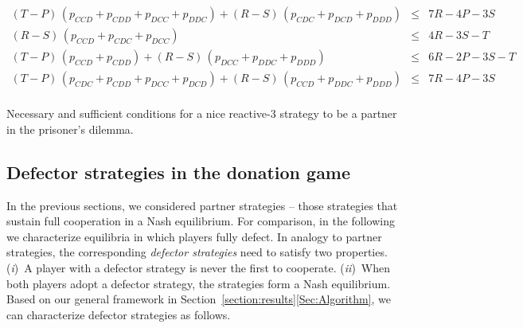 \documentclass[9pt,twoside,lineno]{pnas-new}
\theoremstyle{plainCl1}
\theoremstyle{plainCl2}
\begin{document}
\begin{table}[t!]
{{\begin{equation*}
\begin{array}{rcl}
    (T - P)\,(p_{CCD} + p_{CDD} + p_{DCC} + p_{DDC}) + (R - S)\,(p_{CDC} + p_{DCD} + p_{DDD}) & \le & 7 R \!-\! 4 P \!-\! 3 S \\ [0.2cm]
    (R - S)\,(p_{CCD} + p_{CDC} + p_{DCC}) & \le & 4 R \!-\! 3 S \!-\! T \\ [0.2cm]
    (T - P)\,(p_{CCD} + p_{CDD}) + (R - S)\,(p_{DCC} + p_{DDC} + p_{DDD}) & \le & 6 R \!-\! 2 P \!-\! 3 S \!-\! T \\ [0.2cm]
    (T - P)\,(p_{CDC} + p_{CDD} + p_{DCC} + p_{DCD}) + (R - S)\,(p_{CCD} + p_{DDC} + p_{DDD}) & \le & 7 R \!-\! 4 P \!-\! 3 S \\ [0.2cm]
 \end{array}
 \end{equation*}
 }}
 \caption{Necessary and sufficient conditions for a nice reactive-3 strategy to be a partner in the  prisoner's dilemma.}
 \label{Tab:PartnerReactiveThreePD}
 \end{table}
 
 
 
 
 

\subsection{Defector strategies in the donation game}\label{section:defecting_donation_game}

In the previous sections, we considered partner strategies -- those strategies that sustain full cooperation in a Nash equilibrium.  
For comparison, in the following we characterize equilibria in which players fully defect. 
In analogy to partner strategies, the corresponding {\it defector strategies} need to satisfy two properties. 
({\it i})~A player with a defector strategy is never the first to cooperate. 
({\it ii})~When both players adopt a defector strategy, the strategies form a Nash equilibrium. 
Based on our general framework in Section~\ref{section:results}\ref{Sec:Algorithm}, we can characterize defector strategies as follows. 


\end{document}
